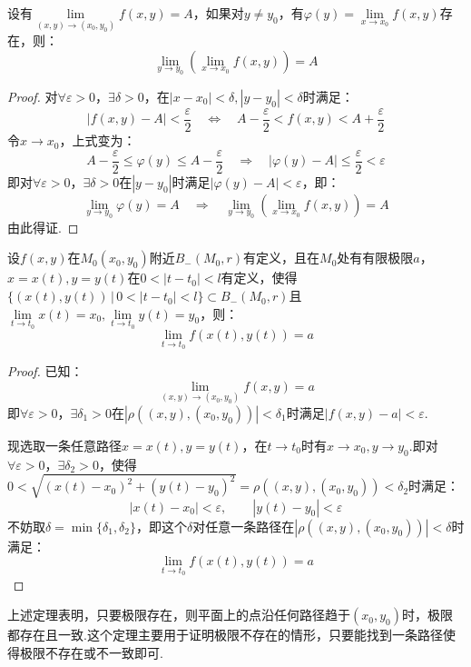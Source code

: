 \begin{theorem}
    设有$\lim\limits_{(x,y) \to (x_0,y_0)}f(x,y) = A$，如果对$y\neq y_0$，有$\varphi(y) = \lim\limits_{x \to x_0}f(x,y)$存在，则：
    \[\lim_{y \to y_0}\left(\lim_{x \to x_0}f(x,y)\right) = A\]
\end{theorem}

\begin{proof}
    对$\forall \varepsilon>0$，$\exists \delta > 0$，在$|x-x_0|<\delta,|y-y_0|<\delta$时满足：
    \[|f(x,y)-A| < \frac{\varepsilon}{2} \quad\Leftrightarrow\quad A - \frac{\varepsilon}{2} < f(x,y) < A + \frac{\varepsilon}{2}\]
    令$x \to x_0$，上式变为：
    \[A - \frac{\varepsilon}{2} \leqslant \varphi(y) \leqslant A - \frac{\varepsilon}{2} \quad\Rightarrow\quad |\varphi(y) - A| \leqslant \frac{\varepsilon}{2} < \varepsilon\]
    即对$\forall \varepsilon>0$，$\exists\delta>0$在$|y-y_0|$时满足$|\varphi(y) - A| < \varepsilon$，即：
    \[\lim_{y \to y_0}\varphi(y) = A \quad\Rightarrow\quad \lim_{y \to y_0}\left(\lim_{x \to x_0}f(x,y)\right) = A\]
    由此得证.
\end{proof}

\begin{theorem}
    设$f(x,y)$在$M_0(x_0,y_0)$附近$B_-(M_0,r)$有定义，且在$M_0$处有有限极限$a$，$x=x(t),y=y(t)$在$0 < |t-t_0| < l$有定义，使得$\{(x(t),y(t))\,|\,0<|t-t_0|<l\}\subset B_-(M_0,r)$且$\lim\limits_{t \to t_0}x(t) = x_0,\lim\limits_{t \to t_0}y(t) = y_0$，则：
    \[\lim_{t \to t_0}f(x(t),y(t)) = a\]
\end{theorem}

\begin{proof}
    已知：
    \[\lim_{(x,y)\to(x_0,y_0)}f(x,y) = a\]
    即$\forall \varepsilon>0$，$\exists \delta_1 > 0$在$|\rho((x,y),(x_0,y_0))|<\delta_1$时满足$|f(x,y)-a|<\varepsilon$.

    现选取一条任意路径$x=x(t),y=y(t)$，在$t\to t_0$时有$x \to x_0,y \to y_0$.即对$\forall \varepsilon > 0$，$\exists \delta_2>0$，使得$0 < \sqrt{(x(t)-x_0)^2+(y(t)-y_0)^2} = \rho((x,y),(x_0,y_0)) < \delta_2$时满足：
    \[|x(t)-x_0|<\varepsilon,\qquad |y(t)-y_0|<\varepsilon\]
    不妨取$\delta = \min\{\delta_1,\delta_2\}$，即这个$\delta$对任意一条路径在$|\rho((x,y),(x_0,y_0))|<\delta$时满足：
    \[\lim_{t \to t_0}f(x(t),y(t)) = a\]
\end{proof}

上述定理表明，只要极限存在，则平面上的点沿任何路径趋于$(x_0,y_0)$时，极限都存在且一致.这个定理主要用于证明极限不存在的情形，只要能找到一条路径使得极限不存在或不一致即可.


